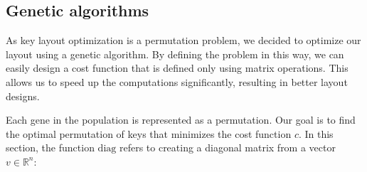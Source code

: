\documentclass[9pt,twocolumn,twoside]{pnas-report}
\begin{document}
{\subsection*{Genetic algorithms}

As key layout optimization is a permutation problem, we decided to optimize our layout using a genetic algorithm.
By defining the problem in this way, we can easily design a cost function that is defined only using matrix operations.
This allows us to speed up the computations significantly, resulting in better layout designs.

Each gene in the population is represented as a permutation.
Our goal is to find the optimal permutation of keys that minimizes the cost function $c$.
In this section, the function $\text{diag}$ refers to creating a diagonal matrix from a vector $v \in \mathbb{R}^n$:

}
\end{document}
